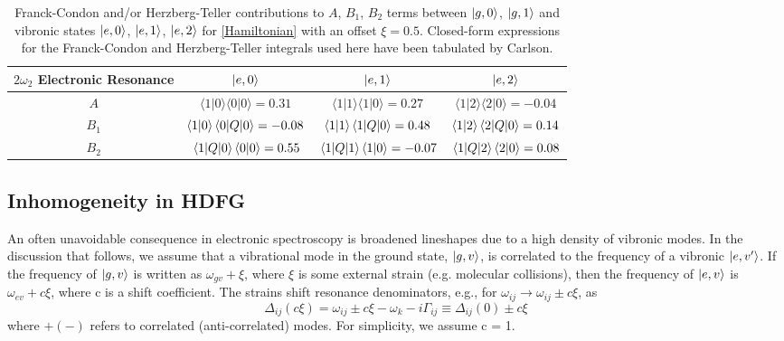 \documentclass[aip, jcp, reprint, onecolumn, nofootinbib]{revtex4-2}
\begin{document}
\begin{table}[!htbp]
	\caption{\label{T:contributions} Franck-Condon and/or Herzberg-Teller contributions to $A$, $B_1$, $B_2$ terms between $\ket{g,0}$, $\ket{g,1}$ and vibronic states $\ket{e,0}$, $\ket{e,1}$, $\ket{e,2}$ for \autoref{Hamiltonian} with an offset $\xi = 0.5$.
	Closed-form expressions for the Franck-Condon and Herzberg-Teller integrals used here have been tabulated by Carlson.\cite{Carlson1988thesis}}
	\begin{ruledtabular}
		\begin{tabular}{cccc}
			$2\omega_2$ Electronic Resonance & $\ket{e,0}$ & $\ket{e,1}$ & $\ket{e,2}$\\
			\hline  
			$A$ 
			& $\langle 1 | 0 \rangle \langle 0 | 0 \rangle = 0.31 $  
			& $\langle 1 | 1 \rangle \langle 1 | 0 \rangle = 0.27 $ 
			& $\langle 1 | 2 \rangle \langle 2 | 0 \rangle = -0.04$\\
					
			$B_1$ 
			& $\langle 1 | 0 \rangle \mel{0}{Q}{0} = -0.08$ 
			& $\langle 1 | 1 \rangle \mel{1}{Q}{0} = 0.48$ 
			&$\langle 1 | 2 \rangle \mel{2}{Q}{0} = 0.14$\\
						
			$B_2$ 
			& $\mel{1}{Q}{0} \langle 0 | 0 \rangle = 0.55$  
			& $\mel{1}{Q}{1} \langle 1 | 0 \rangle = -0.07$ 
			& $\mel{1}{Q}{2} \langle 2 | 0 \rangle = 0.08$\\
		\end{tabular}
	\end{ruledtabular}
\end{table}

\subsection{Inhomogeneity in HDFG}
An often unavoidable consequence in electronic spectroscopy is broadened lineshapes due to a high density of vibronic modes. 
In the discussion that follows, we assume that a vibrational mode in the ground state, $\ket{g,v}$, is correlated to the frequency of a vibronic $\ket{e,v'}$.\cite{Carlson1990line, Dong2015}
If the frequency of $\ket{g,v}$ is written as $\omega_{gv} + \xi$, where $\xi$ is some external strain (e.g. molecular collisions), then the frequency of $\ket{e,v}$ is $\omega_{ev} + c\xi$, where c is a shift coefficient.
The strains shift resonance denominators, e.g., for $\omega_{ij} \rightarrow \omega_{ij} \pm c\xi$, as
\begin{equation}
	\Delta_{ij}(c\xi) = \omega_{ij} \pm c\xi -\omega_k - i\Gamma_{ij} \equiv \Delta_{ij}(0) \pm c\xi
\end{equation}
where $+ (-)$ refers to correlated (anti-correlated) modes.
For simplicity, we assume c = 1.
\end{document}
